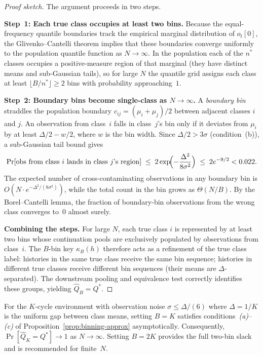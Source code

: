 \begin{proof}[Proof sketch]
The argument proceeds in two steps.

\medskip
\noindent\textbf{Step~1: Each true class occupies at least two bins.}
Because the equal-frequency quantile boundaries track the empirical marginal distribution
of $o_t[0]$, the Glivenko--Cantelli theorem implies that these boundaries converge
uniformly to the population quantile function as $N \to \infty$.
In the population each of the $n^*$ classes occupies a positive-measure region of that
marginal (they have distinct means and sub-Gaussian tails), so for large $N$ the quantile
grid assigns each class at least $\lfloor B / n^* \rfloor \geq 2$ bins with probability
approaching~$1$.

\medskip
\noindent\textbf{Step~2: Boundary bins become single-class as $N \to \infty$.}
A \emph{boundary bin} straddles the population boundary $c_{ij} = (\mu_i + \mu_j)/2$
between adjacent classes $i$ and $j$.
An observation from class~$i$ falls in class~$j$'s bin only if it deviates from $\mu_i$
by at least $\Delta/2 - w/2$, where $w$ is the bin width.
Since $\Delta/2 > 3\sigma$ (condition~(b)), a sub-Gaussian tail bound gives
\[
    \Pr[\text{obs from class } i \text{ lands in class } j\text{'s region}]
    \;\leq\; 2\exp\!\Bigl(-\frac{\Delta^2}{8\sigma^2}\Bigr)
    \;\leq\; 2e^{-9/2} < 0.022.
\]
The expected number of cross-contaminating observations in any boundary bin is
$O(N \cdot e^{-\Delta^2/(8\sigma^2)})$, while the total count in the bin grows as
$\Theta(N/B)$.
By the Borel--Cantelli lemma, the fraction of boundary-bin observations from the
wrong class converges to~$0$ almost surely.

\medskip
\noindent\textbf{Combining the steps.}
For large $N$, each true class $i$ is represented by at least two bins whose
continuation pools are exclusively populated by observations from class~$i$.
The $B$-bin key $\kappa_B(h)$ therefore acts as a refinement of the true class label:
histories in the same true class receive the same bin sequence; histories in different
true classes receive different bin sequences (their means are $\Delta$-separated).
The downstream pooling and equivalence test correctly identifies these groups, yielding
$\widehat{Q}_B = Q^*$.
\end{proof}

\begin{corollary}
\label{cor:kcycle}
For the $K$-cycle environment with observation noise $\sigma \leq \Delta/(6)$
where $\Delta = 1/K$ is the uniform gap between class means, setting $B = K$
satisfies conditions~\emph{(a)}--\emph{(c)} of Proposition~\ref{prop:binning-approx}
asymptotically.
Consequently, $\Pr[\widehat{Q}_K = Q^*] \to 1$ as $N \to \infty$.
Setting $B = 2K$ provides the full two-bin slack and is recommended for finite~$N$.
\end{corollary}

